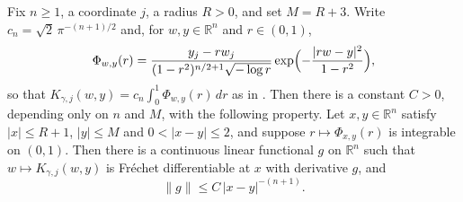 \begin{lemma}
Fix $n \geq 1$, a coordinate $j$, a radius $R > 0$, and set $M = R + 3$.  Write
$c_n = \sqrt2\,\pi^{-(n+1)/2}$ and, for $w,y \in \mathbb{R}^n$ and $r \in (0,1)$,
\[
  \Phi_{w,y}(r) = \frac{y_j - rw_j}{(1-r^2)^{n/2+1}\sqrt{-\log r}}
    \exp\Bigl(-\frac{|rw-y|^2}{1-r^2}\Bigr) ,
\]
so that $K_{\gamma,j}(w,y) = c_n\int_0^1\Phi_{w,y}(r)\,dr$ as in
.  Then there is a constant $C > 0$, depending only on
$n$ and $M$, with the following property.  Let $x,y \in \mathbb{R}^n$ satisfy
$|x| \leq R+1$, $|y| \leq M$ and $0 < |x-y| \leq 2$, and suppose
$r \mapsto \Phi_{x,y}(r)$ is integrable on $(0,1)$.  Then there is a continuous
linear functional $g$ on $\mathbb{R}^n$ such that $w \mapsto K_{\gamma,j}(w,y)$
is Fr\'echet differentiable at $x$ with derivative $g$, and
\[
  \|g\| \leq C\,|x-y|^{-(n+1)} .
\]
\end{lemma}
